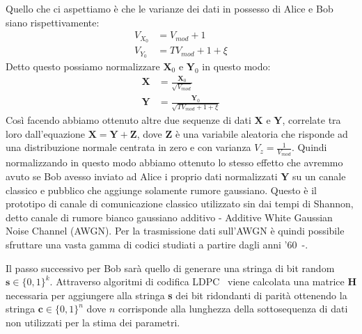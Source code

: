 Quello che ci aspettiamo \`e che le varianze dei dati in possesso di Alice e Bob siano rispettivamente:
\begin{equation}
\begin{split}
V_{X_0} &= V_{mod} + 1 \\
V_{Y_0} &= T V_{mod} + 1 + \xi
\end{split}
\end{equation}
Detto questo possiamo normalizzare $\textbf{X}_0$ e $\textbf{Y}_0$ in questo modo:
\begin{equation}\label{eq:normalizzazione}
\begin{split}
\textbf{X} &= \frac{\textbf{X}_0}{\sqrt{V_{mod}}}\\
\textbf{Y} &= \frac{\textbf{Y}_0}{\sqrt{T V_{mod} + 1 + \xi}}
\end{split}
\end{equation}
Cos\`i facendo abbiamo ottenuto altre due sequenze di dati $\textbf{X}$ e $\textbf{Y}$, correlate tra loro dall'equazione $\textbf{X} = \textbf{Y} + \textbf{Z}$, dove $\textbf{Z}$ \`e una variabile aleatoria che risponde ad una distribuzione normale centrata in zero e con varianza $V_z = \frac{1}{V_{mod}}$. Quindi normalizzando in questo modo abbiamo ottenuto lo stesso effetto che avremmo avuto se Bob avesso inviato ad Alice i proprio dati normalizzati $\textbf{Y}$ su un canale classico e pubblico che aggiunge solamente rumore gaussiano\cite{milicevic_key_2018}. Questo è il prototipo di canale di comunicazione classico utilizzato sin dai tempi di Shannon, detto canale di rumore bianco gaussiano additivo - Additive White Gaussian Noise Channel (AWGN). Per la trasmissione dati sull'AWGN è quindi possibile sfruttare una vasta gamma di codici studiati a partire dagli anni '60~\cite{Gallager_1972}-\cite{richardson2008modern}. 

Il passo successivo per Bob sar\`a quello di generare una stringa di bit random $\textbf{s} \in \{0,1\}^k$. Attraverso algoritmi di codifica LDPC~\cite{borwankar_low_nodate} viene calcolata una matrice \textbf{H} necessaria per aggiungere alla stringa \textbf{s} dei bit ridondanti di parit\`a ottenendo la stringa $\textbf{c} \in \{0,1\}^n$ dove $n$ corrisponde alla lunghezza della sottosequenza di dati non utilizzati per la stima dei parametri.

